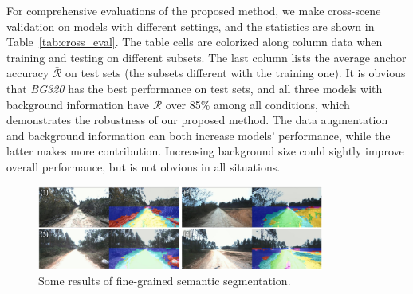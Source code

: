 \documentclass[letterpaper, 10 pt, conference]{ieeeconf}  %
\begin{document}
	For comprehensive evaluations of the proposed method, we make cross-scene validation on models with different settings, and the statistics are shown in Table~\ref{tab:cross_eval}. The table cells are colorized along column data when training and testing on different subsets. The last column lists the average anchor accuracy $\bar{\mathcal{R}}$ on test sets (the subsets different with the training one). It is obvious that \textit{BG320} has the best performance on test sets, and all three models with background information have $\mathcal{R}$ over 85\% among all conditions, which demonstrates the robustness of our proposed method.
	The data augmentation and background information can both increase models' performance, while the latter makes more contribution. Increasing background size could sightly improve overall performance, but is not obvious in all situations.
	
	\begin{figure}[]
		\centering
		\includegraphics[width=0.84\textwidth]{semantic_segmentation.pdf}
		\caption{Some results of fine-grained semantic segmentation.}
		\label{fig:semantic_segmentation}
	\end{figure}
	
\end{document}
